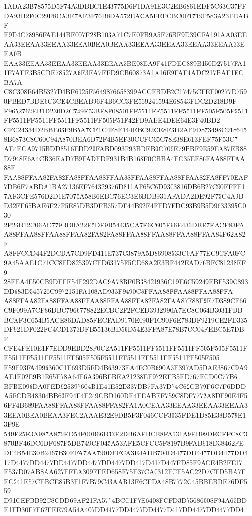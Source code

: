 \documentclass[UTF8,fontset=fandol,zihao=-4,a4paper]{ctexart}
\begin{document}
{{1ADA23B78575D5F74A3DBBC1E43775D6F1DA91E3C2EB6861EDF5C63C37FFDA93B2F0C29F8CA3E7AF3F76B8DA572EACA5FEFCBC0F1719F583A23EEABF
E9D4C78986FAE144BF007F28B103A71C7E0FB9A5F76BF9D39CFA191AA03EEAA33EEAA33EEAA33EEA0BEA0BEAA33EEAA33EEAA33EEAA33EEAA33EEA0B
EAA33EEAA33EEAA33EEAA33EEAA3BE08EA9F41FDEC889B150D27517FA11F7AFF3B5CDE78527A6F3EA7FED9CB60873A1A16E9FAF4ADC217BAF1ECBA7A
C8C308E64B5327D4BF6025F5649876658399ACCFBDB2C17475CFEF00277D7590FBED7BDE6C3CE4CBEAB96F4B6CC3FE569241594E68543FDC2D218D9F
F9652762EB1D230D2C749F53BF8F08501FF5511FF5511FF5511FF505F505F5511FF5511FF5511FF5511FF5511FF505F51F42FD9ABE4DEE64E3F40BD2
CFC24334D2BBE63F9B5A7CF1C4F8E144EBC92CE8F3D2AF9D873498C9186458B6873C8C60C94A870BEA6D72F4B5EF30CCFC65C78E38E613FEF75F53C7
AE4ECA9715BDD8516EDD20FABD093F93BDEB0C709E79BBF9E59EA87EB88D7948E6A4CB36EAD7B9FADFDF931B4B168F0CBBA4FC35EF86FAA88FFAA88F
FAA88FFAA82FA82FA88FFAA88FFAA88FFAA88FFAA88FFAA82FA8FF70EAF7DB6F7ABDA1BA27136EF764329376D811AF65C6D9303816DB6B27C90FFFF1
7AF3CFE576D2D1E7075A58B6EBC76EC3E6BDB931AFADA2DE92F75C4A9BD32FF65BAE6F27F5E87DB3DFB357DF44B92F4FFD7FDC93B9B5D9633395C030
2F26B12C06AC779BD0A22F5DF9B54435CA7F6C605F96E436DBE7EACF83FAA88FFAA88FFAA88FFAA82FA82FA88FFAA88FFAA88FFAA88FFAA84F62A82F
A8FFCCD44F2DCDA7CD9FD411E737C3879A5D86908533C0AF77EC9CFA0FC9A45AAE1C71CC8FD825397CFD63175F5CD68A2E3BF442EAD76BFC81238EF9
28FEA4E50CB9DFFE54F292DAC9A78BF0B38421936C19E6C59249FBF539C893DD683D545726C9972151FA108AD933F9490C8FFAA88FFAA88FFAA88FFA
A88FFAA82FA88FFAA88FFAA88FFAA88FFA82FA82FAA87F88F9E7D389CF66C9F099A7CF86DBC7966778822ECBC2F2FCED3932990A7EC8C064B3031FDB
BCAF3C654B5ACE86DAD85FECFAD9170E090F1C90F6E783DF9219CE2FD335DF921DF022FC4CD1373DFB55136BD56D54E3FFA87E78B7CC04FEBC5E7DBE
CFE4FE10E1F7EDD9EBD28F0C2A511FF5511FF5511FF5511FF505F505F5511FF5511FF5511FF5511FF505F505F5511FF5511FF5511FF5511FF505F505
F59F93FA4996360C1F693D5FD4B63973EA4FC0B690A3F397AD5DAE3867C9A9AE1E02E9B1E65F78A64E6A396BEBEA21238EF972EFB5ED767FCD0C77B6
BFBE096DA0FED925397604B1E41E52D337DB7FA37D74C62CB79F6C7F6DDDA5FCDB48304BB63F94E4F249CBD160DE4FEABEF759C8DF7772A8DF90E4F5
6FF4B689FAA88FFAA88FFAA88FFA82FA1A0CEAA33EEAA33EEAA33EEAA33EEA0BEA0BEAA3FEC2AAAE32E9DB5F3F046CCF3035FDE1D85E38D579E13F9E
549E25E3A987A872ED54F00B66B33F2DB6AFBCB8FA631A9EB99DECFFC8C3870BF46DC6DF687F5DB749CF045A53AFE5CFCC5F8197B9FAB918D38462FE
DF4B54E30B2467B30EFA7AA790DFFCA3E4ADB704D4477DD4477DD4477DD417D4477DD4477DD4477DD4477DD4477DD417D417D447FD85F9ACE4B2FE17
F537D07AB8AA627FFEA309FFED658F75E37CA0312FCF5AC22D7CFD5BA7FEC241E57CEBCE85B3F1F7B79C43AAB13F6CFDA48B7772C45BBEBDE76DF559
D91CEFBB92C8CDD69AF21FA5774BCC1F7E6408FCFD3D75686008F94A63BDE1FD30F7F62FEE79A54A407DD4477DD4477DD4477D417DD4477DD4477DD4
}}
\end{document}
